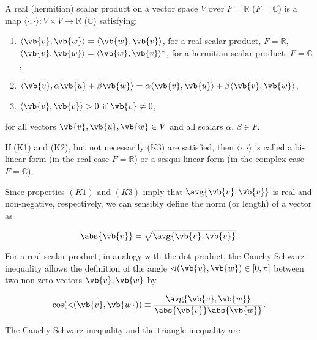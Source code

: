 \documentclass[a4paper,12pt]{report}
\begin{document}
\begin{definition} \label{scalarproduct} 
    A real (hermitian) scalar product on a vector space \( V \) over \( F = \mathbb{R} \) (\( F = \mathbb{C} \)) is a map \(\langle \cdot, \cdot \rangle : V \times V \rightarrow \mathbb{R} \) (\( \mathbb{C} \)) satisfying:
    \begin{enumerate}[label=(\(K\)\arabic*)]
        \item \(\langle \vb{v}, \vb{w} \rangle = \langle \vb{w}, \vb{v} \rangle\), for a real scalar product, \( F = \mathbb{R} \),\\
              \(\langle \vb{v}, \vb{w} \rangle = \langle \vb{w}, \vb{v} \rangle^*\), for a hermitian scalar product, \( F = \mathbb{C} \),
        \item \(\langle \vb{v}, \alpha \vb{u} + \beta \vb{w} \rangle = \alpha \langle \vb{v}, \vb{u} \rangle + \beta \langle \vb{v}, \vb{w} \rangle\),
        \item \(\langle \vb{v}, \vb{v} \rangle > 0\) if \(\vb{v} \neq 0\),
    \end{enumerate}
    for all vectors \(\vb{v}, \vb{u}, \vb{w} \in V\) and all scalars \(\alpha\), \(\beta \in F\).
    
    If (K1) and (K2), but not necessarily (K3) are satisfied, then \(\langle \cdot, \cdot \rangle\) is called a bi-linear form (in the real case \( F = \mathbb{R} \)) or a sesqui-linear form (in the complex case \( F = \mathbb{C} \)).
\end{definition}

Since properties \((K1) \text { and } (K3)\) imply that \(\avg{\vb{v} ,\vb{v} } \) is real and non-negative, respectively, we can sensibly define the norm (or length) of a vector as 

\begin{equation}
    \abs{\vb{v} } = \sqrt{\avg{\vb{v} ,\vb{v} } }.
\end{equation}

For a real scalar product, in analogy with the dot product, the Cauchy-Schwarz inequality allows the definition of the angle \(\sphericalangle (\vb{v} ,\vb{w} ) \in  [0,\pi ]\) between two non-zero vectors \(\vb{v} ,\vb{w} \) by

\begin{equation}
    \cos (\sphericalangle (\vb{v} ,\vb{w} )) \equiv \frac{\avg{\vb{v} ,\vb{w} } }{\abs{\vb{v} }\abs{\vb{w} }  }.
\end{equation}

The Cauchy-Schwarz inequality and the triangle inequality are 
\end{document}
